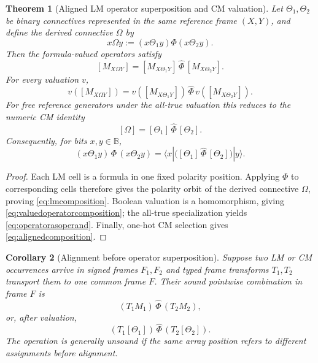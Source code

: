 \documentclass[11pt]{article}
\newtheorem{theorem}{Theorem}[section]
\newtheorem{corollary}[theorem]{Corollary}
\theoremstyle{definition}
\theoremstyle{remark}
\newcommand{\B}{\mathbb B}
\begin{document}
\begin{theorem}[Aligned LM operator superposition and CM valuation]
\label{thm:lmsuperposition}
Let $\Theta_1,\Theta_2$ be binary connectives represented in the same reference frame $(X,Y)$, and define the derived connective $\Omega$ by
\begin{equation}
 x\Omega y:=(x\Theta_1y)\Phi(x\Theta_2y).
 \label{eq:omegadef}
\end{equation}
Then the formula-valued operators satisfy
\begin{equation}
 \boxed{
 [M_{X\Omega Y}]
 =[M_{X\Theta_1Y}]\,\widehat\Phi\,[M_{X\Theta_2Y}].}
 \label{eq:lmcomposition}
\end{equation}
For every valuation $v$,
\begin{equation}
 v([M_{X\Omega Y}])
 =v([M_{X\Theta_1Y}])\,\widehat\Phi\,v([M_{X\Theta_2Y}]).
 \label{eq:valuedoperatorcomposition}
\end{equation}
For free reference generators under the all-true valuation this reduces to the numeric CM identity
\begin{equation}
 \boxed{[\Omega]=[\Theta_1] \,\widehat\Phi\, [\Theta_2].}
 \label{eq:operatorasoperand}
\end{equation}
Consequently, for bits $x,y\in\B$,
\begin{equation}
 \boxed{
 (x\Theta_1y)\,\Phi\,(x\Theta_2y)
 =\langle x|\bigl([\Theta_1] \,\widehat\Phi\, [\Theta_2]\bigr)|y\rangle.}
 \label{eq:alignedcomposition}
\end{equation}
\end{theorem}
\begin{proof}
Each LM cell is a formula in one fixed polarity position.  Applying $\Phi$ to corresponding cells therefore gives the polarity orbit of the derived connective $\Omega$, proving \eqref{eq:lmcomposition}.  Boolean valuation is a homomorphism, giving \eqref{eq:valuedoperatorcomposition}; the all-true specialization yields \eqref{eq:operatorasoperand}.  Finally, one-hot CM selection gives \eqref{eq:alignedcomposition}.
\end{proof}

\begin{corollary}[Alignment before operator superposition]
Suppose two LM or CM occurrences arrive in signed frames $F_1,F_2$ and typed frame transforms $T_1,T_2$ transport them to one common frame $F$.  Their sound pointwise combination in frame $F$ is
\[
 (T_1M_1)\,\widehat\Phi\,(T_2M_2),
\]
or, after valuation,
\[
 (T_1[\Theta_1])\,\widehat\Phi\,(T_2[\Theta_2]).
\]
The operation is generally unsound if the same array position refers to different assignments before alignment.
\end{corollary}
\end{document}
